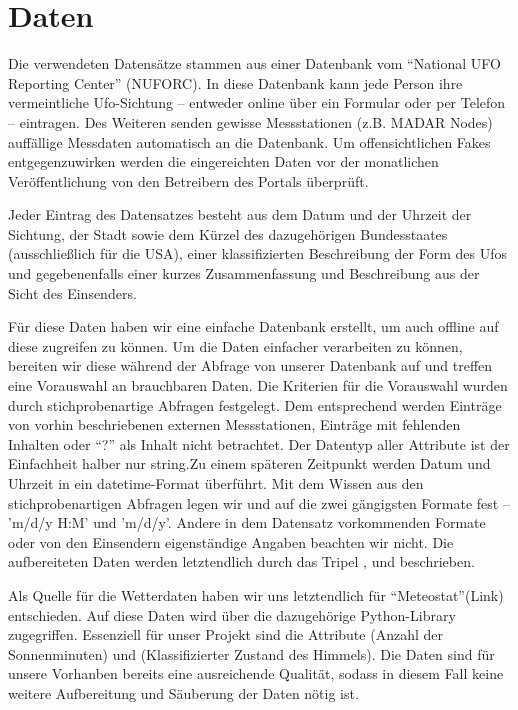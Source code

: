 \section{Daten} \label{data}

Die verwendeten Datensätze stammen aus einer Datenbank vom \enquote{National UFO Reporting Center} (NUFORC). In diese Datenbank kann jede Person ihre vermeintliche Ufo-Sichtung -- entweder online über ein Formular oder per Telefon -- eintragen. Des Weiteren senden gewisse Messstationen (z.B. MADAR Nodes) auffällige Messdaten automatisch an die Datenbank. Um offensichtlichen Fakes entgegenzuwirken werden die eingereichten Daten vor der monatlichen Veröffentlichung von den Betreibern des Portals überprüft.

Jeder Eintrag des Datensatzes besteht aus dem Datum und der Uhrzeit der Sichtung, der Stadt sowie dem Kürzel des dazugehörigen Bundesstaates (ausschließlich für die USA), einer klassifizierten Beschreibung der Form des Ufos und gegebenenfalls einer kurzes Zusammenfassung und Beschreibung aus der Sicht des Einsenders.

Für diese Daten haben wir eine einfache Datenbank erstellt, um auch offline auf diese zugreifen zu können. Um die Daten einfacher verarbeiten zu können, bereiten wir diese während der Abfrage von unserer Datenbank auf und treffen eine Vorauswahl an brauchbaren Daten. Die Kriterien für die Vorauswahl wurden durch stichprobenartige Abfragen festgelegt. Dem entsprechend werden Einträge von vorhin beschriebenen externen Messstationen, Einträge mit fehlenden Inhalten oder \enquote{?} als Inhalt nicht betrachtet. Der Datentyp aller Attribute ist der Einfachheit halber nur string.Zu einem späteren Zeitpunkt werden Datum und Uhrzeit in ein datetime-Format überführt. Mit dem Wissen aus den stichprobenartigen Abfragen legen wir und auf die zwei gängigsten Formate fest -- 'm/d/y H:M' und 'm/d/y'. Andere in dem Datensatz vorkommenden Formate oder von den Einsendern eigenständige Angaben beachten wir nicht. Die aufbereiteten Daten werden letztendlich durch das Tripel ,  und  beschrieben.

Als Quelle für die Wetterdaten haben wir uns letztendlich für \enquote{Meteostat}(Link) entschieden. Auf diese Daten wird über die dazugehörige Python-Library zugegriffen. Essenziell für unser Projekt sind die Attribute  (Anzahl der Sonnenminuten) und  (Klassifizierter Zustand des Himmels). Die Daten sind für unsere Vorhanben bereits eine ausreichende Qualität, sodass in diesem Fall keine weitere Aufbereitung und Säuberung der Daten nötig ist.